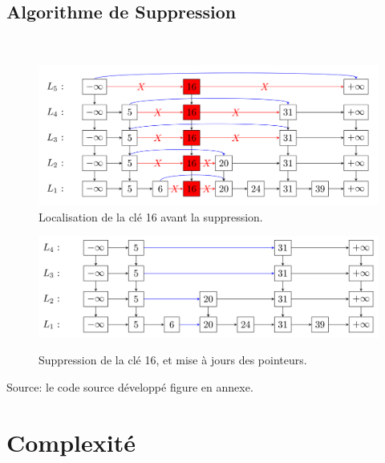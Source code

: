 \documentclass{beamer}
\begin{document}
\subsection{Algorithme de Suppression}
{
	\begin{frame}
		~\\[-0.8cm]
		\begin{figure}
			\centering
			\includegraphics[height=0.38\textheight]{del1.png}\\[-.4cm]
			\caption{Localisation de la clé 16 avant la suppression.} 
			\includegraphics[height=0.3\textheight]{del2.png}\\[-.4cm]
			\caption{Suppression de la clé 16, et mise à jours des pointeurs.}			
		\end{figure}
	\centering
	{\footnotesize {Source: le code source développé figure en annexe.}}
	
	\end{frame}
}


\section[Complexité]{Complexité}
\end{document}
